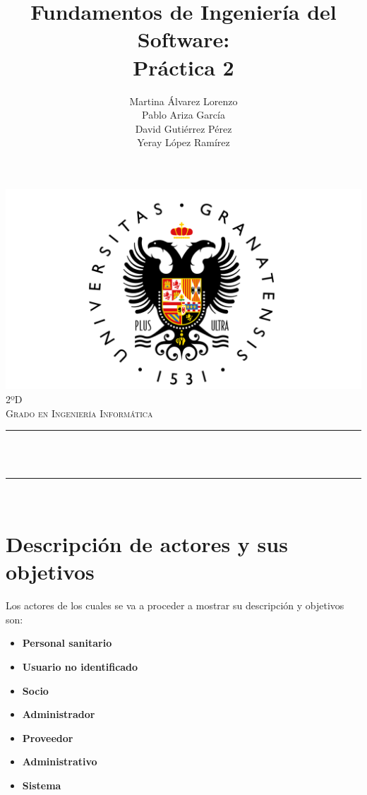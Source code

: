 \documentclass[12pt, spanish]{article}
\title{Fundamentos de Ingeniería del Software:\\
Práctica 2  \hspace{0.05cm} }
\date{}
\author{
\begin{center}
Martina Álvarez Lorenzo  \\
Pablo Ariza García  \\
David Gutiérrez Pérez  \\
Yeray López Ramírez \\
\end{center}
}
\makeatletter
\let\thetitle\@title
\let\theauthor\@author
\makeatother
\begin{document}

\begin{titlepage}
  \centering
  \vspace*{0.5 cm}
  \includegraphics[scale = 0.20]{logoUGR.png}\\[1.0 cm]
  \textsc{\large 2ºD}\\[0.5 cm]
  \textsc{\large Grado en Ingeniería Informática}\\[0.5 cm]              
  \rule{\linewidth}{0.2 mm} \\[0.4 cm]
  { \huge \bfseries \thetitle}\\
  \rule{\linewidth}{0.2 mm} \\[1.5 cm]
  
      
  \theauthor

  \vfill
  
\end{titlepage}

\newpage



\tableofcontents
\pagebreak
\section{Descripción de actores y sus objetivos}
Los actores de los cuales se va a proceder a mostrar su descripción y objetivos son:
\begin{itemize}
    \setlength\itemsep{0.1em}
    \item \textbf{Personal sanitario}
    \item \textbf{Usuario no identificado}
    \item \textbf{Socio}
    \item \textbf{Administrador}
    \item \textbf{Proveedor} 
    \item \textbf{Administrativo}
    \item \textbf{Sistema} \\
       
\end{itemize}
\end{document}
